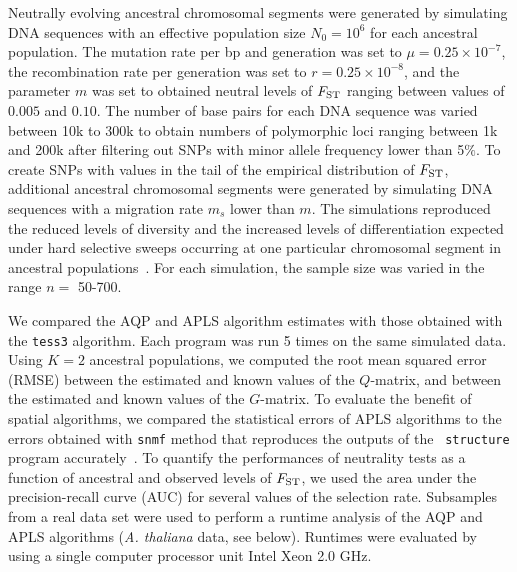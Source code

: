 Neutrally evolving ancestral chromosomal segments were generated by simulating
DNA sequences with an effective population size $N_0 = 10^6$ for each ancestral
population. The mutation rate per bp and generation was set to $\mu = 0.25
\times 10^{-7}$, the recombination rate per generation was set to $r = 0.25
\times 10^{-8}$, and the parameter $m$ was set to obtained neutral levels of
$F_{\rm ST}$ ranging between values of $0.005$ and $0.10$. The number of base
pairs for each DNA sequence was varied between 10k to 300k to obtain numbers of
polymorphic loci ranging between 1k and 200k after filtering out SNPs with
minor allele frequency lower than 5$\%$. To create SNPs with values in the tail
of the empirical distribution of $F_{\rm ST}$, additional ancestral chromosomal
segments were generated by simulating DNA sequences with a migration rate $m_s$
lower than $m$. The simulations reproduced the reduced levels of diversity and
the increased levels of differentiation expected under hard selective sweeps
occurring at one particular chromosomal segment in ancestral
populations~\citep{Martins2016}. For each simulation, the sample size was varied
in the range $n =$ 50-700.

We compared the AQP and APLS algorithm estimates with those obtained with the
{\tt tess3} algorithm. Each program was run 5 times on the same simulated data.
Using $K = 2$ ancestral populations, we computed the root mean squared error
(RMSE) between the estimated and known values of the $Q$-matrix, and between the
estimated and known values of the $G$-matrix. To evaluate the benefit of spatial
algorithms, we compared the statistical errors of APLS algorithms to the errors
obtained with {\tt snmf} method that reproduces the outputs of the {\tt
  structure} program accurately~\citep{Frichot2014,Frichot2015}. To quantify the
performances of neutrality tests as a function of ancestral and observed levels
of $F_{\rm ST}$, we used the area under the precision-recall curve (AUC) for
several values of the selection rate. Subsamples from a real data set were used
to perform a runtime analysis of the AQP and APLS algorithms ({\it A. thaliana}
data, see below). Runtimes were evaluated by using a single computer processor
unit Intel Xeon 2.0 GHz.

